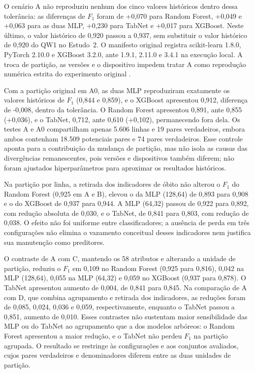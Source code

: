 O cenário A não reproduziu nenhum dos cinco valores históricos dentro dessa tolerância: as diferenças de $F_1$ foram de +0,070 para Random Forest, +0,049 e +0,063 para as duas MLP, +0,230 para TabNet e +0,017 para XGBoost. Neste último, o valor histórico de 0,920 passou a 0,937, sem substituir o valor histórico de 0,920 do QW1 no Estudo~2. O manifesto original registra scikit-learn 1.8.0, PyTorch 2.10.0 e XGBoost 3.2.0, ante 1.9.1, 2.11.0 e 3.4.1 na execução local. A troca de partição, as versões e o dispositivo impedem tratar A como reprodução numérica estrita do experimento original \cite{Jardim2026phdrepo}.

Com a partição original em A0, as duas MLP reproduziram exatamente os valores históricos de $F_1$ (0,844 e 0,859), e o XGBoost apresentou 0,912, diferença de -0,008, dentro da tolerância. O Random Forest apresentou 0,891, ante 0,855 (+0,036), e o TabNet, 0,712, ante 0,610 (+0,102), permanecendo fora dela. Os testes A e A0 compartilham apenas 5.606 linhas e 19 pares verdadeiros, embora ambos contenham 18.509 potenciais pares e 74 pares verdadeiros. Esse controle aponta para a contribuição da mudança de partição, mas não isola as causas das divergências remanescentes, pois versões e dispositivos também diferem; não foram ajustados hiperparâmetros para aproximar os resultados históricos.



Na partição por linha, a retirada dos indicadores de óbito não alterou o $F_1$ do Random Forest (0,925 em A e B), elevou o da MLP (128,64) de 0,893 para 0,908 e o do XGBoost de 0,937 para 0,944. A MLP (64,32) passou de 0,922 para 0,892, com redução absoluta de 0,030, e o TabNet, de 0,841 para 0,803, com redução de 0,038. O efeito não foi uniforme entre classificadores; a ausência de perda em três configurações não elimina o vazamento conceitual desses indicadores nem justifica sua manutenção como preditores.

O contraste de A com C, mantendo os 58 atributos e alterando a unidade de partição, reduziu o $F_1$ em 0,109 no Random Forest (0,925 para 0,816), 0,042 na MLP (128,64), 0,055 na MLP (64,32) e 0,059 no XGBoost (0,937 para 0,878). O TabNet apresentou aumento de 0,004, de 0,841 para 0,845. Na comparação de A com D, que combina agrupamento e retirada dos indicadores, as reduções foram de 0,085, 0,024, 0,036 e 0,059, respectivamente, enquanto o TabNet passou a 0,851, aumento de 0,010. Esses contrastes não sustentam maior sensibilidade das MLP ou do TabNet ao agrupamento que a dos modelos arbóreos: o Random Forest apresentou a maior redução, e o TabNet não perdeu $F_1$ na partição agrupada. O resultado se restringe às configurações e aos conjuntos avaliados, cujos pares verdadeiros e denominadores diferem entre as duas unidades de partição.

